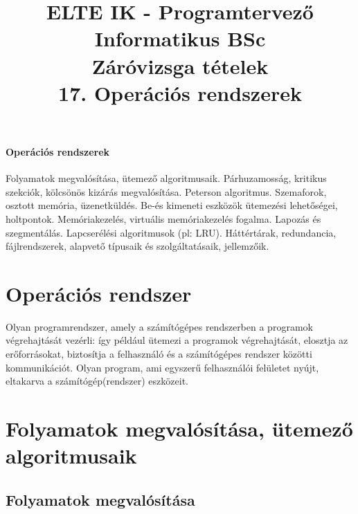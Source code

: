 \documentclass[margin=0px]{article}
\title{\textbf{{\Large ELTE IK - Programtervező Informatikus BSc} \vspace{0.2cm} \\ {\huge Záróvizsga tételek}} \vspace{0.3cm} \\ 17. Operációs rendszerek}
\author{}
\date{}
\newenvironment{tetel}[1]{\paragraph{#1 \\}}{}
\begin{document}
\maketitle

\begin{tetel}{Operációs rendszerek}
    Folyamatok megvalósítása, ütemező algoritmusaik. Párhuzamosság, kritikus szekciók, kölcsönös kizárás megvalósítása. Peterson algoritmus. Szemaforok, osztott memória, üzenetküldés. Be-és kimeneti eszközök ütemezési lehetőségei, holtpontok. Memóriakezelés, virtuális memóriakezelés fogalma. Lapozás és szegmentálás. Lapcserélési algoritmusok (pl: LRU). Háttértárak, redundancia, fájlrendszerek, alapvető típusaik és szolgáltatásaik, jellemzőik.
\end{tetel}

\section{Operációs rendszer}
Olyan programrendszer, amely a számítógépes rendszerben a programok végrehajtását vezérli: így például ütemezi a programok végrehajtását, elosztja az erőforrásokat, biztosítja a felhasználó és a számítógépes rendszer közötti kommunikációt. Olyan program, ami egyszerű felhasználói felületet nyújt, eltakarva a számítógép(rendszer) eszközeit. \\

\section{Folyamatok megvalósítása, ütemező algoritmusaik}

\subsection{Folyamatok megvalósítása}
\end{document}
